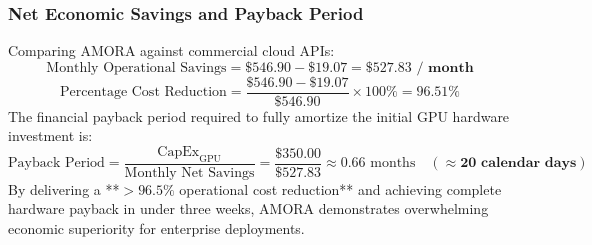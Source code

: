 \subsubsection{Net Economic Savings and Payback Period}
Comparing AMORA against commercial cloud APIs:
\begin{equation}
    \text{Monthly Operational Savings} = \$546.90 - \$19.07 = \mathbf{\$527.83 \text{ / month}}
\end{equation}
\begin{equation}
    \text{Percentage Cost Reduction} = \frac{\$546.90 - \$19.07}{\$546.90} \times 100\% = \mathbf{96.51\%}
\end{equation}
The financial payback period required to fully amortize the initial GPU hardware investment is:
\begin{equation}
    \text{Payback Period} = \frac{\text{CapEx}_{\text{GPU}}}{\text{Monthly Net Savings}} = \frac{\$350.00}{\$527.83} \approx 0.66 \text{ months} \quad (\mathbf{\approx 20 \text{ calendar days}})
\end{equation}
By delivering a **$>96.5\%$ operational cost reduction** and achieving complete hardware payback in under three weeks, AMORA demonstrates overwhelming economic superiority for enterprise deployments.
